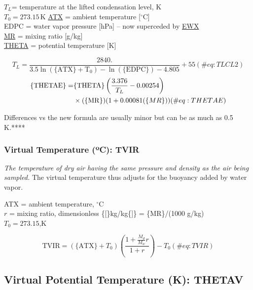 \documentclass[
  english,
]{book}
\begin{document}
\(T_{L}\)= temperature at the lifted condensation level, K\\
\(T_0=273.15\,\mathrm{K}\) \protect\hyperlink{ambient-t}{ATX} = ambient
temperature {[}\(^{\circ}\mathrm{C}\){]}\\
EDPC = water vapor pressure {[}hPa{]} -- now superceded by
\protect\hyperlink{ewx}{EWX}\\
\protect\hyperlink{MR}{MR} = mixing ratio {[}g/kg{]}\\
\protect\hyperlink{theta}{THETA} = potential temperature {[}K{]}

\begin{equation}
T_{L}=\frac{2840.}{3.5\ln(\mathrm{\{ATX\}+T_{0}})-\ln(\mathrm{\{EDPC\}})-4.805}+55
(\#eq:TLCL2)
\end{equation} \begin{align}
\mathrm{\{THETAE\}} = & \mathrm{\{THETA\}}\left(\frac{3.376}{T_{L}}-0.00254\right)\notag \\
& \times (\mathrm{\{MR\}})(1+0.00081(\{MR\}))
(\#eq:THETAE)
\end{align}

Differences vs the new formula are usually minor but can be as much as
0.5 K.****

\hypertarget{TVIR}{%
\subsubsection*{\texorpdfstring{Virtual Temperature ({º}C):
TVIR}{Virtual Temperature (ºC): TVIR}}\label{TVIR}}

\emph{The temperature of dry air having the same pressure and density as
the air being sampled.} The virtual temperature thus adjusts for the
buoyancy added by water vapor.

ATX = ambient temperature, \(^{\circ}\mathrm{C}\)\\
\(r\) = mixing ratio, dimensionless \{{[}\}kg/kg\{{]}\} = \{MR\}/(1000
g/kg)\\
\(T_{0}=273.15\),K

\begin{equation}
\mathrm{TVIR}=(\mathrm{\{ATX\}}+T_{0})\left(\frac{1+\frac{M_{d}}{M_{w}}r}{1+r}\right)-T_{0}
(\#eq:TVIR)
\end{equation}

\hypertarget{thetav}{%
\subsection*{Virtual Potential Temperature (K): THETAV}\label{thetav}}
\end{document}
